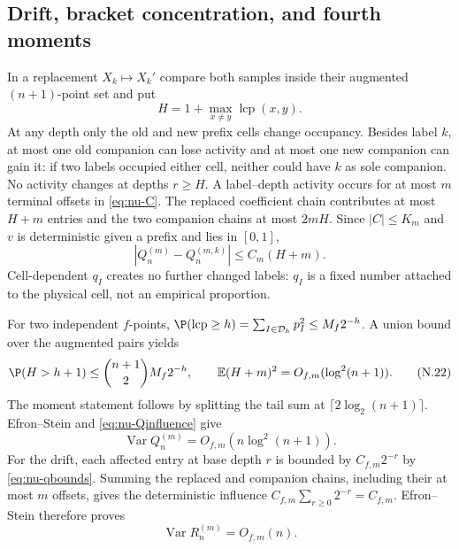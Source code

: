 \documentclass[11pt]{article}
\numberwithin{equation}{section}
\newcommand{\E}{\mathbb E}\newcommand{\Pp}{\mathbb P}
\newcommand{\Var}{\operatorname{Var}}\newcommand{\Cov}{\operatorname{Cov}}
\newcommand{\1}{\mathbf 1}\newcommand{\F}{\mathcal F}\newcommand{\D}{\mathcal D}
\begin{document}
\subsection{Drift, bracket concentration, and fourth moments}
In a replacement $X_k\mapsto X_k'$ compare both samples inside their augmented
$(n+1)$-point set and put
\begin{equation}\label{eq:nu-H}
 H=1+\max_{x\ne y}\operatorname {lcp}(x,y).                   \tag{N.20}
\end{equation}
At any depth only the old and new prefix cells change occupancy.  Besides
label $k$, at most one old companion can lose activity and at most one new
companion can gain it: if two labels occupied either cell, neither could have
$k$ as sole companion.  No activity changes at depths $r\ge H$.  A
label--depth activity occurs for at most $m$ terminal offsets in
\eqref{eq:nu-C}.  The replaced coefficient chain contributes at most $H+m$
entries and the two companion chains at most $2mH$.  Since $|C|\le K_m$ and
$v$ is deterministic given a prefix and lies in $[0,1]$,
\begin{equation}\label{eq:nu-Qinfluence}
 |Q_n^{(m)}-Q_n^{(m,k)}|\le C_m(H+m).                          \tag{N.21}
\end{equation}
Cell-dependent $q_I$ creates no further changed labels: $q_I$ is a fixed
number attached to the physical cell, not an empirical proportion.

For two independent $f$-points,
$\P(\operatorname {lcp}\ge h)=\sum_{I\in\D_h}p_I^2
\le M_f2^{-h}$.  A union bound over the augmented pairs yields
\begin{equation}\label{eq:nu-Htail}
 \P(H>h+1)\le {n+1\choose2}M_f2^{-h},\qquad
 \E(H+m)^2=O_{f,m}(\log^2(n+1)).                              \tag{N.22}
\end{equation}
The moment statement follows by splitting the tail sum at
$\lceil2\log_2(n+1)\rceil$.  Efron--Stein and \eqref{eq:nu-Qinfluence} give
\begin{equation}\label{eq:nu-bracketvar}
 \Var Q_n^{(m)}=O_{f,m}(n\log^2(n+1)).                        \tag{N.23}
\end{equation}
For the drift, each affected entry at base depth $r$ is bounded by
$C_{f,m}2^{-r}$ by \eqref{eq:nu-qbounds}.  Summing the replaced and companion
chains, including their at most $m$ offsets, gives the deterministic influence
$C_{f,m}\sum_{r\ge0}2^{-r}=C_{f,m}$.  Efron--Stein therefore proves
\begin{equation}\label{eq:nu-driftvar}
 \Var R_n^{(m)}=O_{f,m}(n).                                   \tag{N.24}
\end{equation}
\end{document}

